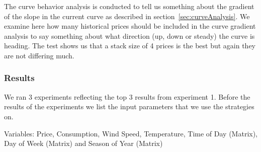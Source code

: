 The curve behavior analysis is conducted to tell us something about the gradient of the slope in the current curve as described in section~\ref{sec:curveAnalysis}. We examine here how many historical prices should be included in the curve gradient analysis to say something about what direction (up, down or steady) the curve is heading. The test shows us that a stack size of 4 prices is the best but again they are not differing much.

\subsubsection{Results}
We ran 3 experiments reflecting the top 3 results from experiment 1. Before the results of the experiments we list the input parameters that we use the strategies on. 

Variables: Price, Consumption, Wind Speed, Temperature, Time of Day (Matrix), Day of Week (Matrix) and Season of Year (Matrix)
\begin{table}[H]
\centering  %
\caption{Statistical results} %
\label{table:Statistical1} %
\end{table}

